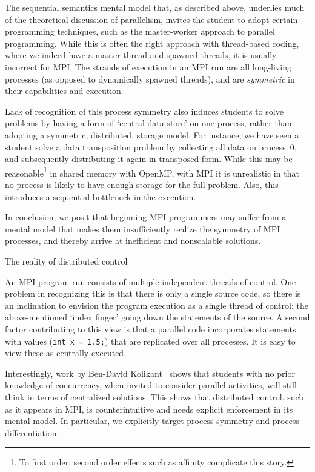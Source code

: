 The sequential semantics mental model that, as described above,
underlies much of the theoretical discussion of parallelism, invites the student to
adopt certain programming techniques, such as the
master-worker approach to parallel programming. While this is
often the right approach with thread-based coding, where we
indeed have a master
thread and spawned threads, it is usually incorrect for \ac{MPI}.
The strands of execution in an \ac{MPI} run are all long-living processes
(as opposed to dynamically spawned threads),
and are \emph{symmetric} in their capabilities and execution.

Lack of recognition of this process symmetry also induces students to
solve problems by having a form of `central data store' on one
process, rather than adopting a symmetric, distributed, storage model.
For instance, we have seen a student solve a data transposition
problem by collecting all data on process~0, and subsequently
distributing it again in transposed form.
%
While this may be
reasonable\footnote {To first order; second order effects such as
  affinity complicate this story.} in shared memory with OpenMP, with
\ac{MPI} it is unrealistic in that no process is likely to have enough
storage for the full problem. Also, this introduces a sequential
bottleneck in the execution.

In conclusion, we posit that beginning MPI programmers may
suffer from a mental model that makes them
insufficiently realize the symmetry of MPI processes,
and thereby arrive at inefficient and nonscalable solutions.

 {The reality of distributed control}

An MPI program run consists of multiple independent threads of control. One
problem in recognizing this is that there is only a single source code, so
there is an inclination to envision the program execution as a single
thread of control: the above-mentioned `index finger' going down the
statements of the source. A second factor contributing to this view is that a
parallel code incorporates statements with values
(\verb+int x = 1.5;+)
that are replicated over all processes. It is easy to view these as
centrally executed.

Interestingly,
work by Ben-David Kolikant~\cite{Kolikant:tickets} shows that students
with no prior knowledge of concurrency, when invited to consider
parallel activities, will still think in terms of centralized
solutions. This shows that distributed control, such as it appears in
\ac{MPI}, is counterintuitive and needs explicit enforcement in its
mental model.
In particular, we explicitly target process symmetry and
process differentiation.

